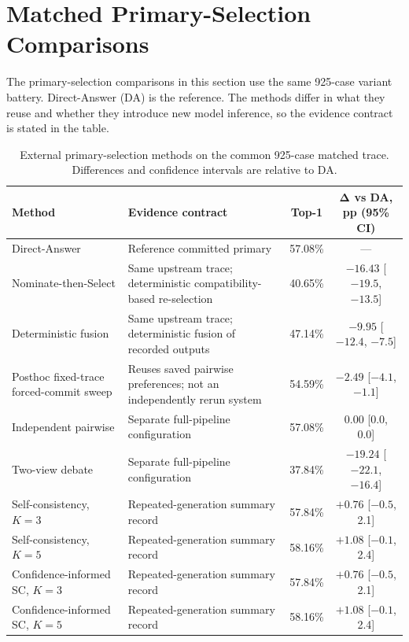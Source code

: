 \section{Matched Primary-Selection Comparisons}
\label{sec:mdd-multiway}

The primary-selection comparisons in this section use the same 925-case variant battery. Direct-Answer (DA) is the reference. The methods differ in what they reuse and whether they introduce new model inference, so the evidence contract is stated in the table.

\begin{table}[htbp]
\centering
\caption{External primary-selection methods on the common 925-case matched trace. Differences and confidence intervals are relative to DA.}
\label{tab:mdd-finalization-results}
\small
\begin{tabularx}{\textwidth}{|>{\raggedright\arraybackslash}p{3.3cm}|>{\raggedright\arraybackslash}p{4.5cm}|c|c|}
\hline
\textbf{Method} & \textbf{Evidence contract} & \textbf{Top-1} & \(\boldsymbol{\Delta}\) \textbf{vs DA, pp (95\% CI)}\\
\hline
Direct-Answer & Reference committed primary & 57.08\% & ---\\
\hline
Nominate-then-Select & Same upstream trace; deterministic compatibility-based re-selection & 40.65\% & \(-16.43\) [\(-19.5\), \(-13.5\)]\\
\hline
Deterministic fusion & Same upstream trace; deterministic fusion of recorded outputs & 47.14\% & \(-9.95\) [\(-12.4\), \(-7.5\)]\\
\hline
Posthoc fixed-trace forced-commit sweep & Reuses saved pairwise preferences; not an independently rerun system & 54.59\% & \(-2.49\) [\(-4.1\), \(-1.1\)]\\
\hline
Independent pairwise & Separate full-pipeline configuration & 57.08\% & \(0.00\) [0.0, 0.0]\\
\hline
Two-view debate & Separate full-pipeline configuration & 37.84\% & \(-19.24\) [\(-22.1\), \(-16.4\)]\\
\hline
Self-consistency, \(K=3\) & Repeated-generation summary record & 57.84\% & \(+0.76\) [\(-0.5\), 2.1]\\
\hline
Self-consistency, \(K=5\) & Repeated-generation summary record & 58.16\% & \(+1.08\) [\(-0.1\), 2.4]\\
\hline
Confidence-informed SC, \(K=3\) & Repeated-generation summary record & 57.84\% & \(+0.76\) [\(-0.5\), 2.1]\\
\hline
Confidence-informed SC, \(K=5\) & Repeated-generation summary record & 58.16\% & \(+1.08\) [\(-0.1\), 2.4]\\
\hline
\end{tabularx}
\end{table}

